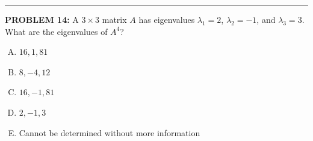 \documentclass[12pt]{amsart}
\newcommand{\divider}{
  \vspace{-1em} %
  \noindent
  \raisebox{-0.15ex}{\textbullet}%
  \hspace{0.5em}%
  \rule[0.5ex]{0.95\textwidth}{1.0pt}%
  \hspace{0.5em}%
  \raisebox{-0.15ex}{\textbullet}%
  \vspace{0em} %
}
\begin{document}
{%
%
%
%

\divider


{\bf PROBLEM 14:}
% 
A $3 \times 3$ matrix $A$ has eigenvalues $\lambda_1 = 2$, $\lambda_2 = -1$, and $\lambda_3 = 3$. 
% 
What are the eigenvalues of $A^4$?

\begin{enumerate}[(A)]
\item $16, 1, 81$
\item $8, -4, 12$
\item $16, -1, 81$
\item $2, -1, 3$
\item Cannot be determined without more information
\end{enumerate}


}
\end{document}
